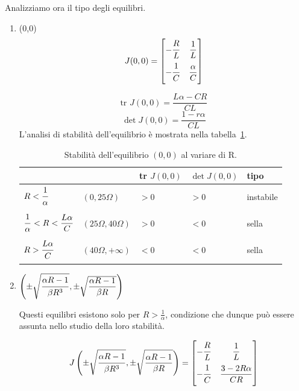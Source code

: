 Analizziamo ora il tipo degli equilibri.
\begin{enumerate}
\item (0,0)\\
\begin{equation}
    J(0,0) =
    \begin{bmatrix}
    -\dfrac{\strut R}{L\strut} & \dfrac{1}{L} \\
    -\dfrac{\strut 1}{C\strut} & \dfrac{\alpha}{C} \\
    \end{bmatrix}
\end{equation}

\begin{equation}
\textrm{tr } J(0,0) = \frac{L\alpha-CR}{CL}
\end{equation}
\begin{equation}
\det J(0,0) = \frac{1-r\alpha}{CL}
\end{equation}
L'analisi di stabilità dell'equilibrio è mostrata nella tabella~\ref{stab-00}.

\begin{table}
    \centering
    \begin{tabular}{l l l l l}
        & & tr $J(0,0)$ & $\det J(0,0)$ & tipo\\
        \hline
        $R<\dfrac{1\strut}{\alpha\strut}$ & $(0, 25 \Omega)$ & $>0$ & $>0$ & instabile \\
        \hline
        $\dfrac{1\strut}{\alpha\strut}<R<\dfrac{L\alpha}{C}$ & $(25 \Omega, 40 \Omega)$ & $>0$ & $<0$ & sella \\
        \hline
        $R>\dfrac{L\alpha\strut}{C\strut}$ & $(40 \Omega, +\infty)$ & $<0$ & $<0$ & sella \\
        \hline
    \end{tabular}
    \caption{Stabilità dell'equilibrio $(0,0)$ al variare di R.}
    \label{stab-00}
\end{table}

\item $\left( \pm \sqrt{\dfrac{\strut\alpha R -1}{\strut\beta R^3}}, \pm \sqrt{\dfrac{\alpha R -1}{\beta R}} \right)$

Questi equilibri esistono solo per $R > \frac{1}{\alpha}$, condizione che dunque può essere assunta nello studio della loro stabilità.

\begin{equation}
    J\left( \pm \sqrt{\dfrac{\strut\alpha R -1}{\strut\beta R^3}}, \pm \sqrt{\dfrac{\alpha R -1}{\beta R}} \right) =
    \begin{bmatrix}
        -\dfrac{R\strut}{L\strut} & \dfrac{1}{L} \\
        -\dfrac{1\strut}{C\strut} & \dfrac{3-2R\alpha}{CR} \\
    \end{bmatrix}
\end{equation}


\end{enumerate}
